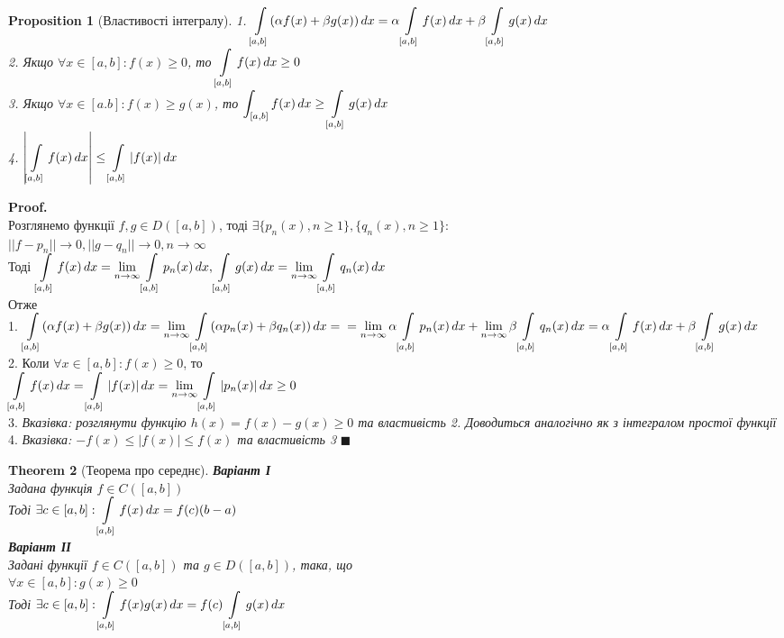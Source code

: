 \documentclass[a4paper, 14pt]{extarticle}
\def\huge{\displaystyle}
\def\bigline{\vspace{5mm}\\}
\theoremstyle{theoremdd}
\newtheorem{theorem}{Theorem}[subsection]
\theoremstyle{theoremdd}
\theoremstyle{theoremdd}
\theoremstyle{theoremdd}
\theoremstyle{theoremdd}
\newtheorem{proposition}[theorem]{Proposition}
\theoremstyle{theoremdd}
\theoremstyle{theoremdd}
\theoremstyle{theoremdd}
\newenvironment{pf}{\vspace*{-3mm} \textbf{Proof. \\}}{$\blacksquare$}
\begin{document}
\begin{proposition}[Властивості інтегралу]
1. $\huge \int\displaylimits_{[a,b]} (\alpha f(x) + \beta g(x))\,dx = \alpha \int\displaylimits_{[a,b]} f(x) \,dx + \beta \int\displaylimits_{[a,b]} g(x)\,dx$\\
2. Якщо $\forall x \in [a,b]: f(x) \geq 0$, то $\huge \int\displaylimits_{[a,b]} f(x)\,dx \geq 0$\\
3. Якщо $\forall x \in [a.b]: f(x) \geq g(x)$, то $\huge \int_{[a,b]} f(x)\,dx \geq \int\displaylimits_{[a,b]} g(x)\,dx$\\
4. $\huge \abs{\int\displaylimits_{[a,b]} f(x)\,dx} \leq \int\displaylimits_{[a,b]} |f(x)|\,dx$
\end{proposition}

\begin{pf}
Розглянемо функції $f, g \in D([a,b])$, тоді $\exists \{p_n(x), n \geq 1\}, \{q_n(x), n \geq 1\}:$\\
$||f-p_n|| \to 0, ||g - q_n|| \to 0, n \to \infty$\\
Тоді $\huge\int\displaylimits_{[a,b]} f(x)\,dx = \lim_{n \to \infty} \int\displaylimits_{[a,b]} p_n(x)\,dx, \huge\int\displaylimits_{[a,b]} g(x)\,dx = \lim_{n \to \infty} \int\displaylimits_{[a,b]} q_n(x)\,dx$ \\ Отже\\
1. $\huge \int\displaylimits_{[a,b]} (\alpha f(x) + \beta g(x))\,dx = \lim_{n \to \infty} \int\displaylimits_{[a,b]} (\alpha p_n(x) + \beta q_n(x))\,dx = \\ = \lim_{n \to \infty} \alpha \int\displaylimits_{[a,b]}p_n(x)\,dx + \lim_{n \to \infty} \beta \int\displaylimits_{[a,b]}q_n(x)\,dx = \alpha \int\displaylimits_{[a,b]} f(x) \,dx + \beta \int\displaylimits_{[a,b]} g(x)\,dx$
\bigline
2. Коли $\forall x \in [a,b]: f(x) \geq 0$, то\\
$\huge \int\displaylimits_{[a,b]} f(x)\,dx = \int\displaylimits_{[a,b]} |f(x)| \,dx = \lim_{n \to \infty} \int\displaylimits_{[a,b]} |p_n(x)| \,dx \geq 0$
\bigline
3. \textit{Вказівка: розглянути функцію $h(x) = f(x) - g(x) \geq 0$ та властивість 2. Доводиться аналогічно як з інтегралом простої функції}
\bigline
4. \textit{Вказівка: $-f(x) \leq |f(x)| \leq f(x)$ та властивість 3}
\end{pf}
\bigline

\begin{theorem}[Теорема про середнє]
\textbf{Варіант І}\\
Задана функція $f \in C([a,b])$ \\ Тоді $\exists c \in [a,b]: \huge\int\displaylimits_{[a,b]} f(x)\,dx = f(c)(b-a)$\\
\textbf{Варіант ІІ}\\
Задані функції $f \in C([a,b])$ та $g \in D([a,b])$, така, що \\ $\forall x \in [a,b]: g(x) \geq 0$\\
Тоді $\exists c \in [a,b]: \huge\int\displaylimits_{[a,b]} f(x)g(x)\,dx = f(c)\int\displaylimits_{[a,b]}g(x)\,dx$
\end{theorem}
\end{document}
